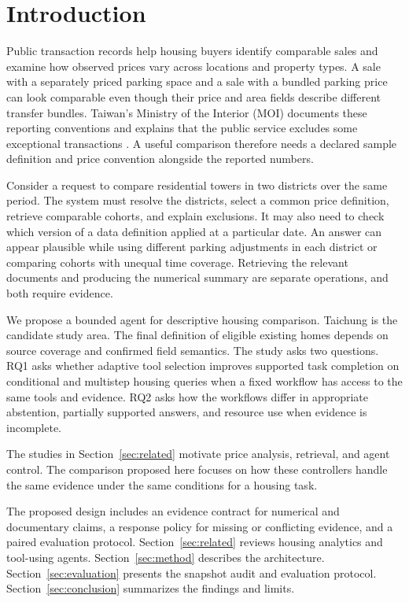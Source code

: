 \section{Introduction}
Public transaction records help housing buyers identify comparable sales and examine how observed prices vary across locations and property types. A sale with a separately priced parking space and a sale with a bundled parking price can look comparable even though their price and area fields describe different transfer bundles. Taiwan's Ministry of the Interior (MOI) documents these reporting conventions and explains that the public service excludes some exceptional transactions \cite{moi}. A useful comparison therefore needs a declared sample definition and price convention alongside the reported numbers.

Consider a request to compare residential towers in two districts over the same period. The system must resolve the districts, select a common price definition, retrieve comparable cohorts, and explain exclusions. It may also need to check which version of a data definition applied at a particular date. An answer can appear plausible while using different parking adjustments in each district or comparing cohorts with unequal time coverage. Retrieving the relevant documents and producing the numerical summary are separate operations, and both require evidence.

We propose a bounded agent for descriptive housing comparison. Taichung is the candidate study area. The final definition of eligible existing homes depends on source coverage and confirmed field semantics. The study asks two questions. RQ1 asks whether adaptive tool selection improves supported task completion on conditional and multistep housing queries when a fixed workflow has access to the same tools and evidence. RQ2 asks how the workflows differ in appropriate abstention, partially supported answers, and resource use when evidence is incomplete.

The studies in Section~\ref{sec:related} motivate price analysis, retrieval, and agent control. The comparison proposed here focuses on how these controllers handle the same evidence under the same conditions for a housing task.

The proposed design includes an evidence contract for numerical and documentary claims, a response policy for missing or conflicting evidence, and a paired evaluation protocol. Section~\ref{sec:related} reviews housing analytics and tool-using agents. Section~\ref{sec:method} describes the architecture. Section~\ref{sec:evaluation} presents the snapshot audit and evaluation protocol. Section~\ref{sec:conclusion} summarizes the findings and limits.

